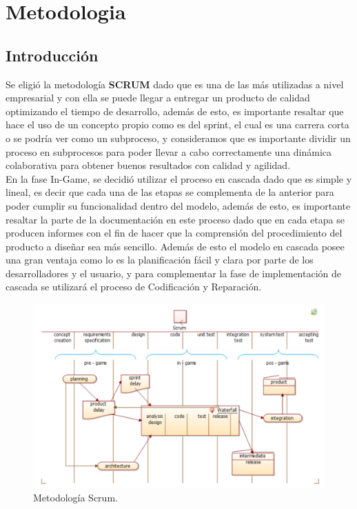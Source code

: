 \chapter{Metodologia}

\section{Introducción}
Se eligió la metodología \textbf{SCRUM} dado que es una de las más utilizadas a nivel empresarial y con ella se puede llegar a entregar un producto de calidad optimizando el tiempo de desarrollo, además de esto, es importante resaltar que hace el uso de un concepto propio como es del sprint, el cual es una carrera corta o se podría ver como un subproceso, y consideramos que es importante dividir un proceso en subprocesos para poder llevar a cabo correctamente una dinámica colaborativa para obtener buenos resultados con calidad y agilidad.\\
En la fase In-Game, se decidió utilizar el proceso en cascada dado que es simple y lineal, es decir que cada una de las etapas se complementa de la anterior para poder cumplir su funcionalidad dentro del modelo, además de esto, es importante resaltar la parte de la documentación en este proceso dado que en cada etapa se producen informes con el fin de hacer que la comprensión del procedimiento del producto a diseñar sea más sencillo. Además de esto el modelo en cascada posee una gran ventaja como lo es la planificación fácil y clara por parte de los desarrolladores y el usuario, y para complementar la fase de implementación de cascada se utilizará el proceso de Codificación y Reparación. \\

\begin{figure}[H]
	\centering
	\includegraphics[scale=0.65,]{imagenes/Metodologia/Scrum.pdf}
	\caption{Metodología Scrum.}
	\label{fig:cronograma}
\end{figure}


